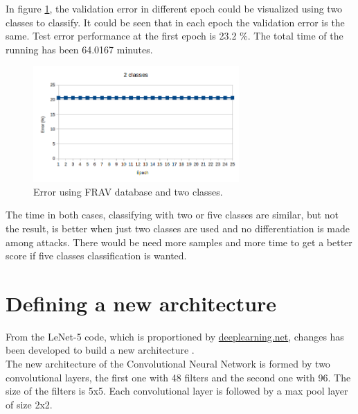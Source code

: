 In figure \ref{fig:FRAV_two}, the validation error in different epoch could be visualized using two classes to classify. It could be seen that in each epoch the validation error is the same. Test error performance at the first epoch is 23.2 \%. The total time of the running has been 64.0167 minutes.\\

\begin{figure}[htb]
\centering
\includegraphics[width=0.7\textwidth]{images/epoch_2classes_FRAV_1.png}
\caption{Error using FRAV database and two classes.}
\label{fig:FRAV_two}
\end{figure}

The time in both cases, classifying with two or five classes are similar, but not the result, is better when just two classes are used and no differentiation is made among attacks. There would be need more samples and more time to get a better score if five classes classification is wanted.\\


\section{Defining a new architecture}
From the LeNet-5 code, which is proportioned by \url{deeplearning.net}, changes has been developed to build a new architecture \cite{LSTM-CNN}. \\


The new architecture of the Convolutional Neural Network is formed by two convolutional layers, the first one with 48 filters and the second one with 96. The size of the filters is 5x5. Each convolutional layer is followed by a max pool layer of size 2x2.\\


